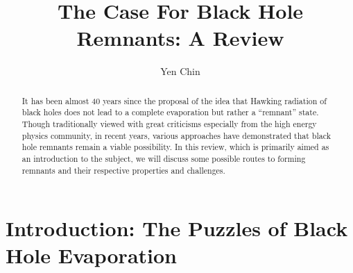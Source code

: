 \documentclass[preprintnumbers, floatfix, preprintnumbers, letterpaper, twocolumn, superscriptaddress,nofootinbib]{revtex4-2}
\begin{document}
\title{The Case For Black Hole Remnants: A Review}

	
\author{Yen Chin }


\begin{abstract}
It has been almost 40 years since the proposal of the idea that Hawking radiation of black holes does not lead to a complete evaporation but rather a ``remnant'' state. Though traditionally viewed with great criticisms especially from the high energy physics community, in recent years, various approaches have demonstrated that black hole remnants remain a viable possibility. In this review, which is primarily aimed as an introduction to the subject, we will discuss some possible routes to forming remnants and their respective properties and challenges. 
\end{abstract} 

\maketitle
\section{Introduction: The Puzzles of Black Hole Evaporation}
\end{document}
